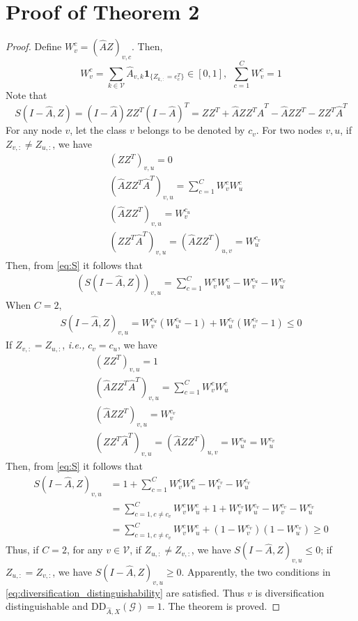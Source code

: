 \documentclass{article}
\newcommand\ie{\textit{i.e.,}}
\newcommand{\0}{{\boldsymbol{0}}}
\newcommand{\6}{{\partial}}
\newcommand{\8}{{\infty}}
\newcommand{\4}{{\nabla}}
\begin{document}
\section{Proof of Theorem 2}
\label{appendix:proof_theorem2}
\begin{proof}
Define $ W_v^{c}=(\hat{A}Z)_{v,c}$. 
Then,
\begin{equation*}
    W_v^{c}=
    \sum\limits_{k\in \mathcal{V}} \hat{A}_{v,k} \bm{1}_{\{Z_{k,:} = e_c^T\}} \in [0,1], \ \ \sum\limits_{c=1}^C W_v^c = 1
\end{equation*}
Note that
\begin{equation} \label{eq:S}
S(I-\hat{A},Z) = (I-\hat{A})ZZ^T(I-\hat{A})^T = ZZ^T + \hat{A}ZZ^T\hat{A}^T - \hat{A}ZZ^T - ZZ^T\hat{A}^T 
\end{equation}
For any node $v$, let the class $v$ belongs to be denoted by $c_v$.
For two nodes $v,u$, if $Z_{v,:} \neq Z_{u,:}$, we have
\begin{align*}
    &(ZZ^T)_{v,u} = 0\\
    & (\hat{A}ZZ^T\hat{A}^T)_{v,u} = \sum\limits_{c=1}^C W_v^c W_u^c \\
    & (\hat{A}ZZ^T)_{v,u} = W_v^{c_u} \\
    & (ZZ^T\hat{A}^T)_{v,u} = (\hat{A}ZZ^T)_{u,v} =  W_u^{c_v}
\end{align*}
Then, from \eqref{eq:S} it follows that
\begin{align*}
    (S(I-\hat{A},Z))_{v,u} = \sum\limits_{c=1}^C W_v^c W_u^c  - W_v^{c_u} - W_u^{c_v}
\end{align*}
When $C=2$,  
\begin{align*}
    S(I-\hat{A},Z)_{v,u} = W_v^{c_u}( W_u^{c_u}-1) + W_u^{c_v} (W_v^{c_v}-1) \leq 0
\end{align*}
If $Z_{v,:} = Z_{u,:}$, \ie{} $c_v=c_u$, we have
\begin{align*}
    &(ZZ^T)_{v,u} = 1\\
    & (\hat{A}ZZ^T\hat{A}^T)_{v,u} = \sum\limits_{c=1}^C W_v^c W_u^c \\
    & (\hat{A}ZZ^T)_{v,u} = W_v^{c_v} \\
    & (ZZ^T\hat{A}^T)_{v,u} = (\hat{A}ZZ^T)_{u,v} =  W_u^{c_u} = W_u^{c_v}
\end{align*}
Then, from \eqref{eq:S} it follows that
\begin{align*}
    S(I-\hat{A},Z)_{v,u} &= 1+\sum\limits_{c=1}^C W_v^c W_u^c  - W_v^{c_v} - W_u^{c_v}\\
    & = \sum\limits_{c=1,c\neq c_v}^C W_v^c W_u^c + 1+ W_v^{c_v}W_u^{c_v} - W_v^{c_v} - W_u^{c_v}\\
    & = \sum\limits_{c=1,c\neq c_v}^C W_v^c W_u^c + (1- W_v^{c_v})(1-W_u^{c_v}) \geq 0
\end{align*}
Thus, if $C=2$, for any $v\in\mathcal{V}$, if $Z_{u,:} \neq Z_{v,:}$, we have $S(I-\hat{A},Z)_{v,u} \leq 0$; if $Z_{u,:} = Z_{v,:}$, we have $S(I-\hat{A},Z)_{v,u} \geq 0$. Apparently, the two conditions in \eqref{eq:diversification_distinguishability} are satisfied.
Thus $v$ is  diversification distinguishable and $\mathrm{DD}_{\hat{A},X}(\mathcal{G})=1$.
The theorem is proved.
\end{proof}
\end{document}
